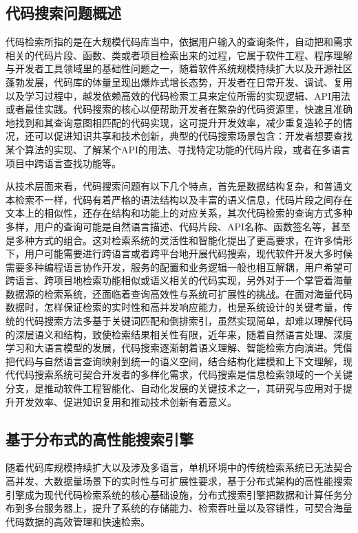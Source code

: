 \documentclass[UTF8,a4paper,12pt]{ctexart}
\numberwithin{equation}{section}
\begin{document}
\subsection{代码搜索问题概述}
代码检索所指的是在大规模代码库当中，依据用户输入的查询条件，自动把和需求相关的代码片段、函数、类或者项目检索出来的过程，它属于软件工程、程序理解与开发者工具领域里的基础性问题之一，随着软件系统规模持续扩大以及开源社区蓬勃发展，代码库的体量呈现出爆炸式增长态势，开发者在日常开发、调试、复用以及学习过程中，越发依赖高效的代码检索工具来定位所需的实现逻辑、API用法或者最佳实践。代码搜索的核心以便帮助开发者在繁杂的代码资源里，快速且准确地找到和其查询意图相匹配的代码实现，这可提升开发效率，减少重复造轮子的情况，还可以促进知识共享和技术创新，典型的代码搜索场景包含：开发者想要查找某个算法的实现、了解某个API的用法、寻找特定功能的代码片段，或者在多语言项目中跨语言查找功能等。\par
从技术层面来看，代码搜索问题有以下几个特点，首先是数据结构复杂，和普通文本检索不一样，代码有着严格的语法结构以及丰富的语义信息，代码片段之间存在文本上的相似性，还存在结构和功能上的对应关系，其次代码检索的查询方式多种多样，用户的查询可能是自然语言描述、代码片段、API名称、函数签名等，甚至是多种方式的组合。这对检索系统的灵活性和智能化提出了更高要求，在许多情形下，用户可能需要进行跨语言或者跨平台地开展代码搜索，现代软件开发大多时候需要多种编程语言协作开发，服务的配置和业务逻辑一般也相互解耦，用户希望可跨语言、跨项目地检索功能相似或语义相关的代码实现，另外对于一个掌管着海量数据源的检索系统，还面临着查询高效性与系统可扩展性的挑战。在面对海量代码数据时，怎样保证检索的实时性和高并发响应能力，也是系统设计的关键考量，传统的代码搜索方法多基于关键词匹配和倒排索引，虽然实现简单，却难以理解代码的深层语义和结构，致使检索结果相关性有限，近年来，随着自然语言处理、深度学习和大语言模型的发展，代码搜索逐渐朝着语义理解、智能检索方向演进。凭借把代码与自然语言查询映射到统一的语义空间，结合结构化建模和上下文理解，现代代码搜索系统可契合开发者的多样化需求，代码搜索是信息检索领域的一个关键分支，是推动软件工程智能化、自动化发展的关键技术之一，其研究与应用对于提升开发效率、促进知识复用和推动技术创新有着意义。\par

\subsection{基于分布式的高性能搜索引擎}
随着代码库规模持续扩大以及涉及多语言，单机环境中的传统检索系统已无法契合高并发、大数据量场景下的实时性与可扩展性要求，基于分布式架构的高性能搜索引擎成为现代代码检索系统的核心基础设施，分布式搜索引擎把数据和计算任务分布到多台服务器上，提升了系统的存储能力、检索吞吐量以及容错性，可契合海量代码数据的高效管理和快速检索。
\end{document}
